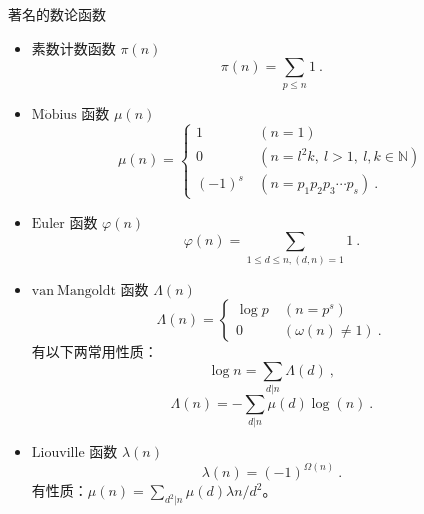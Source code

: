 \begin{example}{著名的数论函数}
\begin{itemize}
\item 素数计数函数 $\pi(n)$
\begin{equation}
\pi(n)=\sum_{p\leq n} 1~.
\end{equation}
\item $\mathrm{M\ddot{o}bius}$ 函数 $\mu(n)$
\begin{equation}
\mu(n)=
\begin{cases}
1&\ (n=1)\\
0&\ (n=l^2k,\ l>1,\ l,k\in\mathbb{N})\\
(-1)^s&\ (n=p_1p_2p_3\cdots p_s)~.
\end{cases}
\end{equation}
\item $\mathrm{Euler}$ 函数 $\varphi(n)$
\begin{equation}
\varphi(n)=\sum_{1\leq d\leq n,(d,n)=1}1~.
\end{equation}
\item $\mathrm{van\ Mangoldt}$ 函数 $\Lambda(n)$
\begin{equation}
\varLambda(n)=
\begin{cases}
\log p&\ (n=p^s)\\
0&\ (\omega(n)\neq 1)~.
\end{cases}
\end{equation}
有以下两常用性质：
$$\log n = \sum_{d|n} \varLambda(d) ~,$$
$$\varLambda(n) = - \sum_{d|n}  \mu(d) \log(n) ~.$$
\item $\mathrm{Liouville}$ 函数 $\lambda(n)$
\begin{equation}
\lambda(n)=(-1)^{\Omega(n)}~.
\end{equation}
有性质：$\mu(n) = \sum_{d^2 | n} \mu(d) \lambda{n/d^2}$。
\end{itemize}

\end{example}
